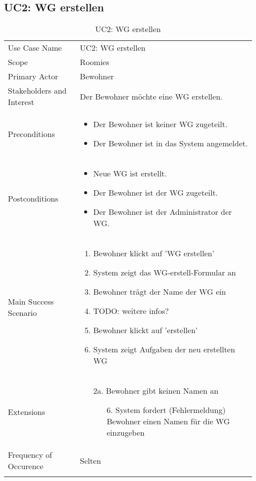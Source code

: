 \subsection{UC2: WG erstellen}
\begin{table}[H]
	\tablestyle
	\tablealtcolored
	\begin{tabularx}{\textwidth}{lX}
		\tablebody
			Use Case Name &
			UC2: WG erstellen
			\tabularnewline
			Scope &
			Roomies
			\tabularnewline
			Primary Actor &
			Bewohner
			\tabularnewline
			Stakeholders and Interest &
			Der Bewohner möchte eine WG erstellen.
			\tabularnewline
			Preconditions &
			\begin{itemize}
				\item Der Bewohner ist keiner WG zugeteilt.
				\item Der Bewohner ist in das System angemeldet.
			\end{itemize}
			\tabularnewline
			Postconditions &
			\begin{itemize}
				\item Neue WG ist erstellt.
				\item Der Bewohner ist der WG zugeteilt.
				\item Der Bewohner ist der Administrator der WG.
			\end{itemize}
			\tabularnewline
			Main Success Scenario &
			\begin{enumerate}
				\item Bewohner klickt auf 'WG erstellen'
				\item System zeigt das WG-erstell-Formular an
				\item Bewohner trägt der Name der WG ein
				\item TODO: weitere infos?
				\item Bewohner klickt auf 'erstellen'
				\item System zeigt Aufgaben der neu erstellten WG
			\end{enumerate}
			\tabularnewline
			Extensions &
			\begin{itemize}
				\item[2a.] Bewohner gibt keinen Namen an
				\begin{itemize}
					\item[6.] System fordert (Fehlermeldung) Bewohner einen Namen für die WG einzugeben
				\end{itemize}
			\end{itemize}
			\tabularnewline
			Frequency of Occurence &
			Selten
			\tabularnewline
		\tableend
	\end{tabularx}
	\caption{UC2: WG erstellen}
\end{table}


